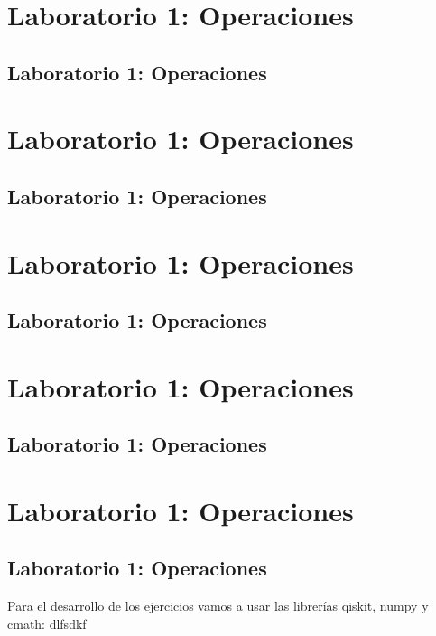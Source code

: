 \documentclass[11pt]{article}
\begin{document}
	
	
	
	
	
	

	
	
	\section{Laboratorio 1: Operaciones}

	\subsection{Laboratorio 1: Operaciones}

	\section{Laboratorio 1: Operaciones}

	\subsection{Laboratorio 1: Operaciones}

	\section{Laboratorio 1: Operaciones}

	\subsection{Laboratorio 1: Operaciones}

	\section{Laboratorio 1: Operaciones}

	\subsection{Laboratorio 1: Operaciones}

	\section{Laboratorio 1: Operaciones}

	\subsection{Laboratorio 1: Operaciones}

	Para el desarrollo de los ejercicios vamos a usar las librerías qiskit, numpy y cmath:
	\newpage
	dlfsdkf
\end{document}
